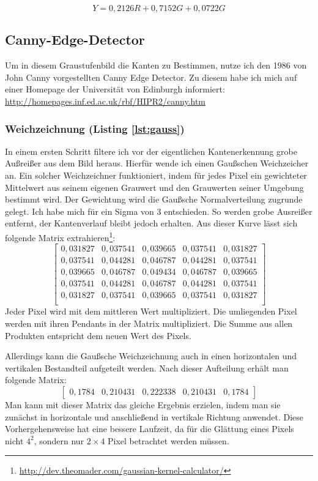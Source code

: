 \begin{equation}
Y = 0,2126R+0,7152G+0,0722G
\end{equation}

\subsection{Canny-Edge-Detector}
Um in diesem Graustufenbild die Kanten zu Bestimmen, nutze ich den 1986 von John Canny vorgestellten Canny Edge Detector. Zu diesem habe ich mich auf einer Homepage der Universität von Edinburgh informiert: \url{http://homepages.inf.ed.ac.uk/rbf/HIPR2/canny.htm}
\subsubsection{Weichzeichnung (Listing \ref{lst:gauss})}
In einem ersten Schritt filtere ich vor der eigentlichen Kantenerkennung grobe Außreißer aus dem Bild heraus. Hierfür wende ich einen Gaußschen Weichzeicher an. Ein solcher Weichzeichner funktioniert, indem für jedes Pixel ein gewichteter Mittelwert aus seinem eigenen Grauwert und den Grauwerten seiner Umgebung bestimmt wird. Der Gewichtung wird die Gaußsche Normalverteilung zugrunde gelegt. Ich habe mich für ein Sigma von 3 entschieden. So werden grobe Ausreißer entfernt, der Kantenverlauf bleibt jedoch erhalten. Aus dieser Kurve lässt sich folgende Matrix extrahieren\footnote{\url{http://dev.theomader.com/gaussian-kernel-calculator/}}:
\begin{equation}
	\begin{bmatrix}
	0,031827&0,037541&0,039665&0,037541&0,031827 \\
	0,037541&0,044281&0,046787&0,044281&0,037541 \\
	0,039665&0,046787&0,049434&0,046787&0,039665 \\
	0,037541&0,044281&0,046787&0,044281&0,037541 \\
	0,031827&0,037541&0,039665&0,037541&0,031827 \\
	\end{bmatrix}
\end{equation}
Jeder Pixel wird mit dem mittleren Wert multipliziert. Die umliegenden Pixel werden mit ihren Pendants in der Matrix multipliziert. Die Summe aus allen Produkten entspricht dem neuen Wert des Pixels.

Allerdings kann die Gaußsche Weichzeichnung auch in einen horizontalen und vertikalen Bestandteil aufgeteilt werden. Nach dieser Aufteilung erhält man folgende Matrix:
\begin{equation}
	\begin{bmatrix}
	0,1784&0,210431&0,222338&0,210431&0,1784
	\end{bmatrix}
\end{equation}
Man kann mit dieser Matrix das gleiche Ergebnis erzielen, indem man sie zunächst in horizontale und anschließend in vertikale Richtung anwendet. Diese Vorhergehensweise hat eine bessere Laufzeit, da für die Glättung eines Pixels nicht \(4^2\), sondern nur \(2\times 4\) Pixel betrachtet werden müssen.

